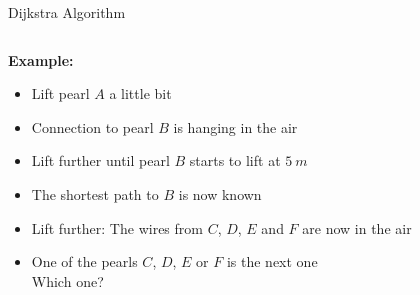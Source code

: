 
\begin{frame}{Dijkstra Algorithm}
  \vspace{-1.5em}
  \begin{columns}
    \begin{column}{0.55\linewidth}
      \textbf{Example:}
      \begin{itemize}
        \item
          Lift pearl {\color{MainA}$A$} a little bit
        \item
          Connection to pearl {\color{MainA}$B$} is hanging in the air
        \item
          Lift further until pearl {\color{MainA}$B$} starts to lift at
          $\SI{5}{m}$
        \item
          The shortest path to {\color{MainA}$B$} is now known
        \item
          Lift further: The wires from {\color{MainA}$C$},
          {\color{MainA}$D$}, {\color{MainA}$E$} and {\color{MainA}$F$}
          are now in the air
        \item
          One of the pearls {\color{MainA}$C$}, {\color{MainA}$D$},
          {\color{MainA}$E$} or {\color{MainA}$F$} is the next one\\
          {\color{gray}Which one?}
      \end{itemize}
    \end{column}
\end{columns}
\end{frame}
